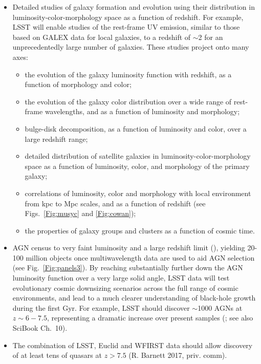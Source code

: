 \begin{itemize}
\item Detailed studies of galaxy formation and evolution using their distribution in
luminosity-color-morphology space as a function of redshift. For example, LSST will
enable studies of the rest-frame UV emission, similar to those based on GALEX data
for local galaxies, to a redshift of $\sim$2 for an unprecedentedly large number of
galaxies. These studies project onto many axes:
\begin{itemize}
  \item the evolution of the galaxy luminosity function with redshift, as a function of
        morphology and color;
  \item the evolution of the galaxy color distribution over a wide range of rest-frame
        wavelengths, and as a function of luminosity and morphology;
  \item bulge-disk decomposition, as a function of luminosity and color, over
        a large redshift range;
  \item detailed distribution of satellite galaxies in luminosity-color-morphology space
        as a function of luminosity, color, and morphology of the primary galaxy;
  \item correlations of luminosity, color and morphology with local environment from
           kpc to Mpc scales, and as a function of redshift (see  Figs.~\ref{Fig:musyc} and \ref{Fig:cowan});
  \item the properties of galaxy groups and clusters as a function of cosmic time.
\end{itemize}
\item AGN census to very faint luminosity and a large redshift limit
  (\cite{2014IAUS..304...11I}), yielding 20-100 million objects once multiwavelength
      data are used to aid AGN selection (see Fig.~\ref{Fig:panels3}). By reaching substantially further
      down the AGN luminosity function over a very large solid angle, LSST data
      will test evolutionary cosmic downsizing scenarios across the full range of cosmic environments,
      and lead to a much clearer understanding of black-hole growth during the first Gyr. For
      example, LSST should discover $\sim$1000 AGNs at $z\sim6-7.5$,
      representing a dramatic increase over present samples
      (\cite{2007AAS...21113709B}; see also SciBook Ch.~10).
\item The combination of LSST, Euclid and WFIRST data should allow discovery of at least
       tens of quasars at $z>7.5$ (R. Barnett 2017, priv. comm).

\end{itemize}
